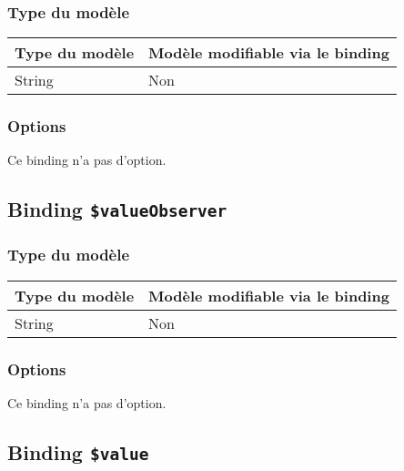 \subsubsection{Type du modèle}

\begin{tabular}{|l|l|}
\hline
\textbf{Type du modèle} & \textbf{Modèle modifiable via le binding}\\
\hline
String & Non\\
\hline
\end{tabular}
\subsubsection{Options}

Ce binding n'a pas d'option.









\subsection{Binding \texttt{\$valueObserver}}

\subsubsection{Type du modèle}

\begin{tabular}{|l|l|}
\hline
\textbf{Type du modèle} & \textbf{Modèle modifiable via le binding}\\
\hline
String & Non\\
\hline
\end{tabular}
\subsubsection{Options}

Ce binding n'a pas d'option.









\subsection{Binding \texttt{\$value}}

